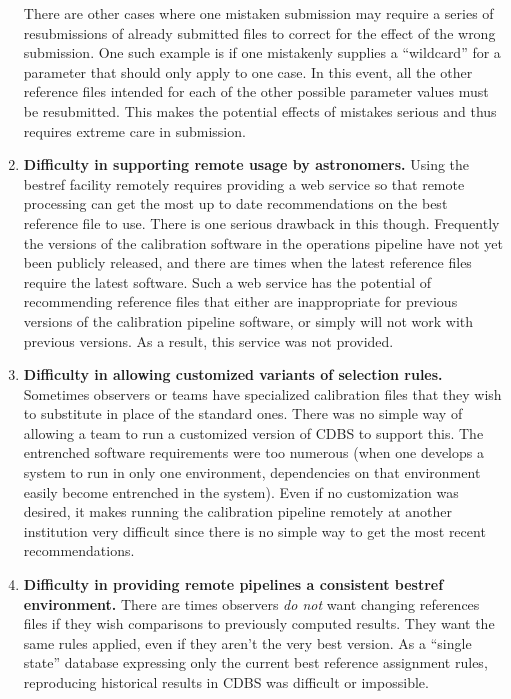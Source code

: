 \documentclass[final,authoryear,5p,times,twocolumn]{elsarticle}
\begin{document}
\begin{enumerate}
There are other cases where one mistaken submission may require a series of
resubmissions of already submitted files to correct for the effect of the wrong
submission. One such example is if one mistakenly supplies a ``wildcard'' for a
parameter that should only apply to one case. In this event, all the other
reference files intended for each of the other possible parameter values must
be resubmitted. This makes the potential effects of mistakes serious and thus
requires extreme care in submission.

\item \textbf{Difficulty in supporting remote usage by astronomers.} 
Using the bestref facility remotely
requires providing a web service so that remote processing can get the most up
to date recommendations on the best reference file to use. There is one serious
drawback in this though. Frequently the versions of the calibration software in
the operations pipeline have not yet been publicly released, and there are
times when the latest reference files require the latest software. Such a web
service has the potential of recommending reference files that either are
inappropriate for previous versions of the calibration pipeline software, or
simply will not work with previous versions. As a result, this service was not
provided.

\item \textbf{Difficulty in allowing customized variants of selection rules.}
Sometimes
observers or teams have specialized calibration files that they wish to
substitute in place of the standard ones. There was no simple way of allowing a
team to run a customized version of CDBS to support this. The entrenched
software requirements were too numerous (when one develops a system to run in
only one environment, dependencies on that environment easily become entrenched
in the system). Even if no customization was desired, it makes running the
calibration pipeline remotely at another institution very difficult since there
is no simple way to get the most recent recommendations.

\item \textbf{Difficulty in providing remote pipelines a consistent bestref
environment.}
There are times observers \textit{do not} want changing references files
if they wish comparisons to previously computed results. They want the same
rules applied, even if they aren't the very best version.
As a ``single state'' database expressing only the current best reference
assignment rules, reproducing historical results in CDBS was difficult or
impossible.


\end{enumerate}
\end{document}
